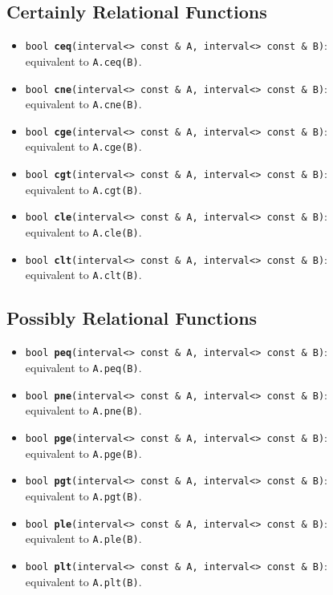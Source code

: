 \documentclass{report}
\begin{document}
\subsection{Certainly Relational Functions}
\begin{itemize}	

	\item
			\texttt{bool {\bf ceq}(interval<> const \& A, interval<> const \& B)}:\\
				equivalent to \texttt{A.ceq(B)}.
		\item
			\texttt{bool {\bf cne}(interval<> const \& A, interval<> const \& B)}:\\
				equivalent to \texttt{A.cne(B)}.
		\item
			\texttt{bool {\bf cge}(interval<> const \& A, interval<> const \& B)}:\\
				equivalent to \texttt{A.cge(B)}.
		\item
			\texttt{bool {\bf cgt}(interval<> const \& A, interval<> const \& B)}:\\
				equivalent to \texttt{A.cgt(B)}.
		\item
			\texttt{bool {\bf cle}(interval<> const \& A, interval<> const \& B)}:\\
				equivalent to \texttt{A.cle(B)}.
		\item
			\texttt{bool {\bf clt}(interval<> const \& A, interval<> const \& B)}:\\
				equivalent to \texttt{A.clt(B)}.
\end{itemize}
\subsection{Possibly Relational Functions}	
\begin{itemize}
	\item
			\texttt{bool {\bf peq}(interval<> const \& A, interval<> const \& B)}:\\
				equivalent to \texttt{A.peq(B)}.
		\item
			\texttt{bool {\bf pne}(interval<> const \& A, interval<> const \& B)}:\\
				equivalent to \texttt{A.pne(B)}.
		\item
			\texttt{bool {\bf pge}(interval<> const \& A, interval<> const \& B)}:\\
				equivalent to \texttt{A.pge(B)}.
		\item
			\texttt{bool {\bf pgt}(interval<> const \& A, interval<> const \& B)}:\\
				equivalent to \texttt{A.pgt(B)}.
		\item
			\texttt{bool {\bf ple}(interval<> const \& A, interval<> const \& B)}:\\
				equivalent to \texttt{A.ple(B)}.
		\item
			\texttt{bool {\bf plt}(interval<> const \& A, interval<> const \& B)}:\\
				equivalent to \texttt{A.plt(B)}.
\end{itemize}
\end{document}
